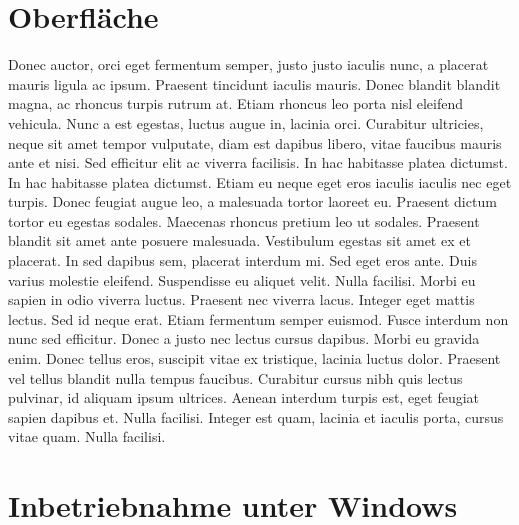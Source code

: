 \section{Oberfläche}

Donec auctor, orci eget fermentum semper, justo justo iaculis nunc, a placerat mauris ligula ac ipsum. Praesent tincidunt iaculis mauris. Donec blandit blandit magna, ac rhoncus turpis rutrum at. Etiam rhoncus leo porta nisl eleifend vehicula. Nunc a est egestas, luctus augue in, lacinia orci. Curabitur ultricies, neque sit amet tempor vulputate, diam est dapibus libero, vitae faucibus mauris ante et nisi. Sed efficitur elit ac viverra facilisis. In hac habitasse platea dictumst. In hac habitasse platea dictumst. Etiam eu neque eget eros iaculis iaculis nec eget turpis.\newpar
Donec feugiat augue leo, a malesuada tortor laoreet eu. Praesent dictum tortor eu egestas sodales. Maecenas rhoncus pretium leo ut sodales. Praesent blandit sit amet ante posuere malesuada. Vestibulum egestas sit amet ex et placerat. In sed dapibus sem, placerat interdum mi. Sed eget eros ante. Duis varius molestie eleifend. Suspendisse eu aliquet velit. Nulla facilisi. Morbi eu sapien in odio viverra luctus.\newpar
Praesent nec viverra lacus. Integer eget mattis lectus. Sed id neque erat. Etiam fermentum semper euismod. Fusce interdum non nunc sed efficitur. Donec a justo nec lectus cursus dapibus. Morbi eu gravida enim. Donec tellus eros, suscipit vitae ex tristique, lacinia luctus dolor. Praesent vel tellus blandit nulla tempus faucibus. Curabitur cursus nibh quis lectus pulvinar, id aliquam ipsum ultrices. Aenean interdum turpis est, eget feugiat sapien dapibus et. Nulla facilisi. Integer est quam, lacinia et iaculis porta, cursus vitae quam. Nulla facilisi.

\section{Inbetriebnahme unter Windows}

